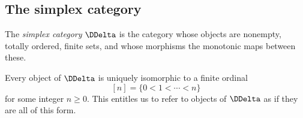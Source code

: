 
\subsection{The simplex category}%
\label{sub:thesimplexcategory}

\begin{definition}
  The \emph{simplex category} $\DDelta$ is the category
  whose objects are nonempty, totally ordered, finite sets,
  and whose morphisms the monotonic maps between these.
\end{definition}

Every object of $\DDelta$ is uniquely isomorphic to a finite ordinal
\[
  [n] = \{ 0 < 1 < \cdots < n \}
\]
for some integer $n \geq 0$.
This entitles us to refer to objects of $\DDelta$ as if they are all of this form.


